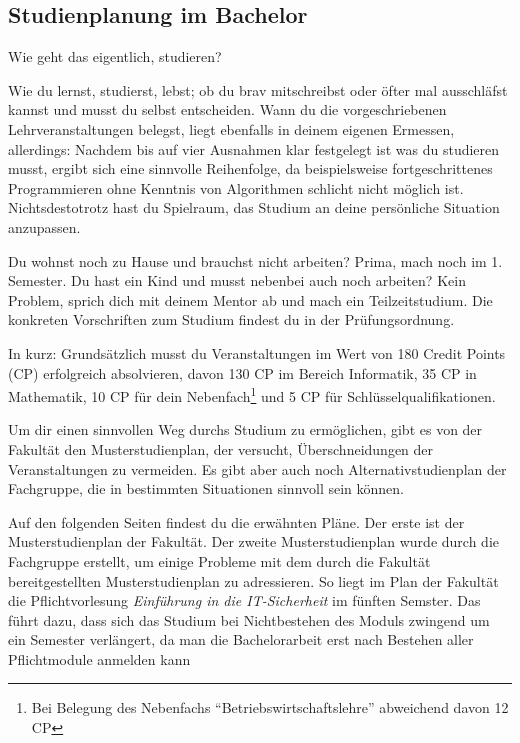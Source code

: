 
\subsection{Studienplanung im Bachelor}

Wie geht das eigentlich, studieren?

Wie du lernst, studierst, lebst; ob du brav mitschreibst oder öfter mal ausschläfst kannst und musst du selbst entscheiden. Wann du die vorgeschriebenen Lehrveranstaltungen belegst, liegt ebenfalls in deinem eigenen Ermessen, allerdings: Nachdem bis auf vier Ausnahmen klar festgelegt ist was du studieren musst, ergibt sich eine sinnvolle Reihenfolge, da beispielsweise fortgeschrittenes Programmieren ohne Kenntnis von Algorithmen schlicht nicht möglich ist. Nichtsdestotrotz hast du Spielraum, das Studium an deine persönliche Situation anzupassen.

Du wohnst noch zu Hause und brauchst nicht arbeiten? Prima, mach noch \iftoggle{winter}{Theoretische Informatik 1}{Technische Informatik 2} im 1. Semester. Du hast ein Kind und musst nebenbei auch noch arbeiten? Kein Problem, sprich dich mit deinem Mentor ab und mach ein Teilzeitstudium. Die konkreten Vorschriften zum Studium findest du in der Prüfungsordnung.


In kurz: Grundsätzlich musst du Veranstaltungen im Wert von 180 Credit Points (CP) erfolgreich absolvieren, davon 130 CP im Bereich Informatik, 35 CP in Mathematik, 10 CP für dein Nebenfach\footnote{Bei Belegung des Nebenfachs \enquote{Betriebswirtschaftslehre} abweichend davon 12 CP} und 5 CP für Schlüsselqualifikationen. 


Um dir einen sinnvollen Weg durchs Studium zu ermöglichen, gibt es von der Fakultät den Musterstudienplan, der versucht, Überschneidungen der Veranstaltungen zu vermeiden. Es gibt aber auch noch Alternativstudienplan der Fachgruppe, die in bestimmten Situationen sinnvoll sein können. 


Auf den folgenden Seiten findest du die erwähnten Pläne. Der erste ist der Musterstudienplan der Fakultät. Der zweite Musterstudienplan wurde durch die Fachgruppe erstellt, um einige Probleme mit dem durch die Fakultät bereitgestellten Musterstudienplan zu adressieren. So liegt im Plan der Fakultät die Pflichtvorlesung \emph{Einführung in die IT-Sicherheit} im fünften Semster. Das führt dazu, dass sich das Studium bei Nichtbestehen des Moduls zwingend um ein Semester verlängert, da man die Bachelorarbeit erst nach Bestehen aller Pflichtmodule anmelden kann

